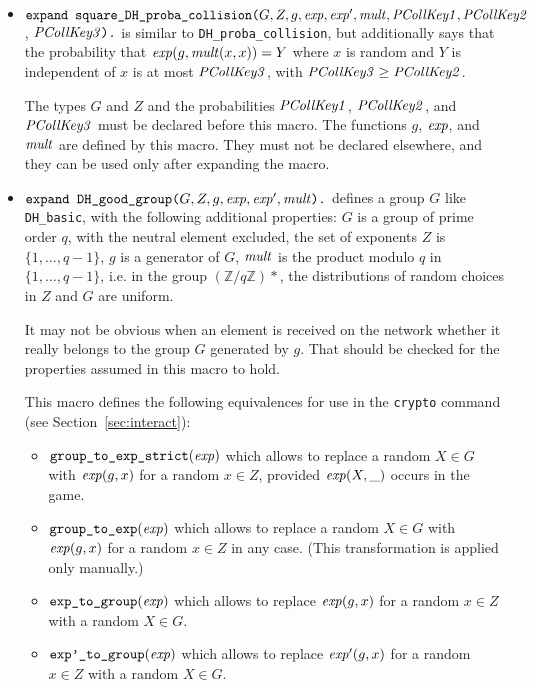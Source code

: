 \documentclass{article}
\begin{document}
\begin{itemize}
\begin{itemize}
\begin{itemize}
     \item $\texttt{expand\ square\_DH\_proba\_collision(}G, Z, g, \vn{exp},
       \vn{exp}', \vn{mult}, \vn{PCollKey1},
       \vn{PCollKey2}$, $\mathit{PCollKey3}\texttt{).}$ is similar to \texttt{DH\_proba\_collision}, but additionally
   says that the probability that $\mathit{exp}(g, \mathit{mult}(x,x)) = Y$ where
   $x$ is random and $Y$ is independent of $x$ is at most $\mathit{PCollKey3}$, with $\mathit{PCollKey3} \geq \mathit{PCollKey2}$.
       
       The types $G$ and $Z$ and the probabilities $\mathit{PCollKey1}$, $\mathit{PCollKey2}$, 
       and $\mathit{PCollKey3}$ must be declared before this macro.  The
       functions $g$, $\mathit{exp}$, and $\mathit{mult}$ are defined by this
       macro. They must not be declared elsewhere, and they can be
       used only after expanding the macro.

     \item $\texttt{expand\ DH\_good\_group(}G, Z, g, \mathit{exp}, \mathit{exp}', \mathit{mult}\texttt{).}$ defines a group $G$ like
       \texttt{DH\_basic}, with the following additional properties:
       $G$ is a group of prime order $q$, with the neutral element excluded, 
       the set of exponents $Z$ is $\{1, \dots, q-1\}$,
       $g$ is a generator of $G$, 
       $\mathit{mult}$ is the product modulo $q$ in $\{1, \dots, q-1\}$, i.e. in the group $(\mathbb{Z}/q\mathbb{Z})*$,
       the distributions of random choices in $Z$ and $G$ are uniform.

       It may not be obvious when an element is received on the network
       whether it really belongs to the group $G$ generated by $g$. That should 
       be checked for the properties assumed in this macro to hold.

       This macro defines the following equivalences for use in the
       \texttt{crypto} command (see Section~\ref{sec:interact}):
       \begin{itemize}
       \item $\texttt{group\_to\_exp\_strict}(\mathit{exp})$ which allows to replace
         a random $X \in G$ with $\mathit{exp}(g,x)$ for a random $x \in Z$, provided
         $\mathit{exp}(X,\_)$ occurs in the game.
       \item $\texttt{group\_to\_exp}(\mathit{exp})$ which allows to replace
         a random $X \in G$ with $\mathit{exp}(g,x)$ for a random $x \in Z$ in any case.
         (This transformation is applied only manually.)
       \item $\texttt{exp\_to\_group}(\mathit{exp})$ which allows to replace
         $\mathit{exp}(g,x)$ for a random $x \in Z$ with a random $X \in G$.
       \item $\texttt{exp'\_to\_group}(\mathit{exp})$ which allows to replace
         $\mathit{exp'}(g,x)$ for a random $x \in Z$ with a random $X \in G$.
       \end{itemize}


\end{itemize}
\end{itemize}
\end{itemize}
\end{document}
